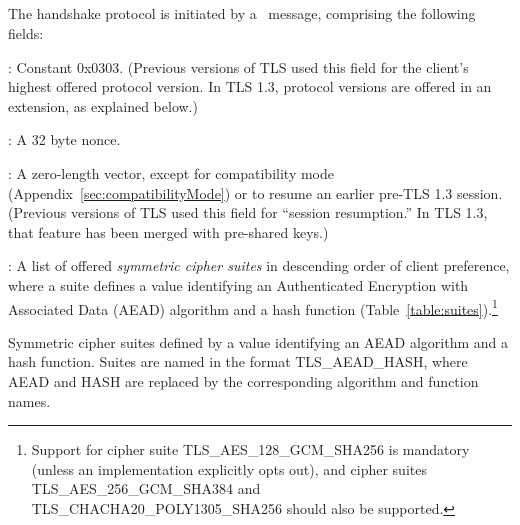 \subsection{\ClientHello}\label{sec:handshakeCH}\label{sec:CH}

The handshake protocol is initiated by a \ClientHello\ message, %
comprising the following fields:

\begin{description}

\item \TLSlegacyVersion: Constant 0x0303.
%
%
(Previous versions of TLS used this field for the client's highest offered 
  protocol version. In TLS 1.3, protocol versions are offered in an 
  extension, as explained below.)

\item \TLSrandom: A 32 byte nonce.

\item \TLSlegacySessionId: A zero-length vector, except for 
  compatibility mode (Appendix~\ref{sec:compatibilityMode}) 
  or to resume an earlier pre-TLS 1.3 session. 
  (Previous versions of TLS used this field for 
  ``session resumption.'' In TLS 1.3, that feature has been 
  merged with pre-shared keys.)

\item \TLScipherSuites: A list of offered \emph{symmetric cipher suites} in
  descending order of client preference, where a suite defines a value identifying an Authenticated Encryption 
  with Associated Data (AEAD) algorithm and a hash function (Table~\ref{table:suites}).\footnote{
    Support for cipher suite TLS\_AES\_128\_GCM\_SHA256 is mandatory (unless an implementation 
    explicitly opts out), and cipher suites TLS\_AES\_256\_GCM\_SHA384 and 
    TLS\_CHACHA20\_POLY1305\_SHA256 should also be supported.
  }


\begin{table}[tbp]
\caption{Symmetric cipher suites defined by a value identifying
  an AEAD algorithm and a hash function. Suites are named in the 
  format TLS\_AEAD\_HASH, where AEAD and HASH are replaced by the 
  corresponding algorithm and function names.}
\label{table:suites}


\end{table}
\end{description}
